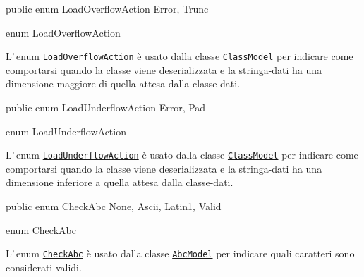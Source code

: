 \documentclass[a4paper,10pt]{report}
\newif\ifesource
\newenvironment{elisting}[1][H]
  {\captionsetup{aboveskip=0pt}\begin{listing}[#1]}
  {\end{listing}%
}
\begin{document}
\ifesource
\begin{lstlisting}[language=java, 
caption=enum LoadOverflowAction, 
label=lst:LoadOverflowAction]
public enum LoadOverflowAction { Error, Trunc }
\end{lstlisting}\index{LoadOverflowAction}
\else
\begin{elisting}
\begin{javacode}
public enum LoadOverflowAction { Error, Trunc }
\end{javacode}
\caption{enum LoadOverflowAction}\label{lst:LoadOverflowAction}
\end{elisting}
\fi
L'\,enum \hyperref[lst:LoadOverflowAction]{\texttt{LoadOverflowAction}} è usato 
dalla classe \hyperref[lst:ClassModel]{\texttt{ClassModel}} per indicare come 
comportarsi quando la classe viene deserializzata e la stringa-dati ha una 
dimensione maggiore di quella attesa dalla classe-dati.

\ifesource
\begin{lstlisting}[language=java, 
caption=enum LoadUnderflowAction, 
label=lst:LoadUnderflowAction]
public enum LoadUnderflowAction { Error, Pad }
\end{lstlisting}\index{LoadUnderflowAction}
\else
\begin{elisting}
\begin{javacode}
public enum LoadUnderflowAction { Error, Pad }
\end{javacode}
\caption{enum LoadUnderflowAction}\label{lst:LoadUnderflowAction}
\end{elisting}
\fi
L'\,enum \hyperref[lst:LoadUnderflowAction]{\texttt{LoadUnderflowAction}} è 
usato dalla classe \hyperref[lst:ClassModel]{\texttt{ClassModel}} per indicare 
come comportarsi quando la classe viene deserializzata e la stringa-dati ha una 
dimensione inferiore a quella attesa dalla classe-dati.

\ifesource
\begin{lstlisting}[language=java, 
caption=enum CheckAbc, 
label=lst:CheckAbc]
public enum CheckAbc { None, Ascii, Latin1, Valid }
\end{lstlisting}\index{CheckAbc}
\else
\begin{elisting}
\begin{javacode}
public enum CheckAbc { None, Ascii, Latin1, Valid }
\end{javacode}
\caption{enum CheckAbc}\label{lst:CheckAbc}
\end{elisting}
\fi
L'\,enum \hyperref[lst:CheckAbc]{\texttt{CheckAbc}} è usato dalla classe
\hyperref[lst:AbcModel]{\texttt{AbcModel}} per indicare quali caratteri sono
considerati validi.
\end{document}
